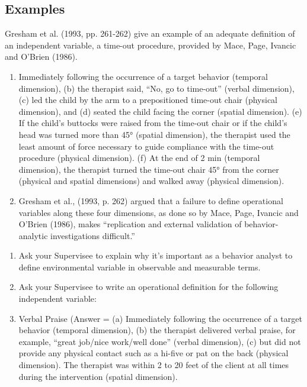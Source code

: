 \subsection{Examples}
Gresham et al. (1993, pp. 261-262) give an example of an adequate definition of an independent variable, a time-out procedure, provided by Mace, Page, Ivancic and O'Brien (1986).
\begin{enumerate}
\item Immediately following the occurrence of a target behavior (temporal dimension), (b) the therapist said, ``No, go to time-out'' (verbal dimension), (c) led the child by the arm to a prepositioned time-out chair (physical dimension), and (d) seated the child facing the corner (spatial dimension). (e) If the child's buttocks were raised from the time-out chair or if the child's head was turned more than 45° (spatial dimension), the therapist used the least amount of force necessary to guide compliance with the time-out procedure (physical dimension). (f) At the end of 2 min (temporal dimension), the therapist turned the time-out chair 45° from the corner (physical and spatial dimensions) and walked away (physical dimension).
\item Gresham et al., (1993, p. 262) argued that a failure to define operational variables along these four dimensions, as done so by Mace, Page, Ivancic and O'Brien (1986), makes ``replication and external validation of behavior-analytic investigations difficult.''
\end{enumerate}
%
\begin{enumerate}
\item Ask your Supervisee to explain why it's important as a behavior analyst to define environmental variable in observable and measurable terms. 
\item Ask your Supervisee to write an operational definition for the following independent variable:
\item Verbal Praise (Answer = (a) Immediately following the occurrence of a target behavior (temporal dimension), (b) the therapist delivered verbal praise, for example, ``great job/nice work/well done'' (verbal dimension), (c) but did not provide any physical contact such as a hi-five or pat on the back (physical dimension). The therapist was within 2 to 20 feet of the client at all times during the intervention (spatial dimension).
\end{enumerate}
